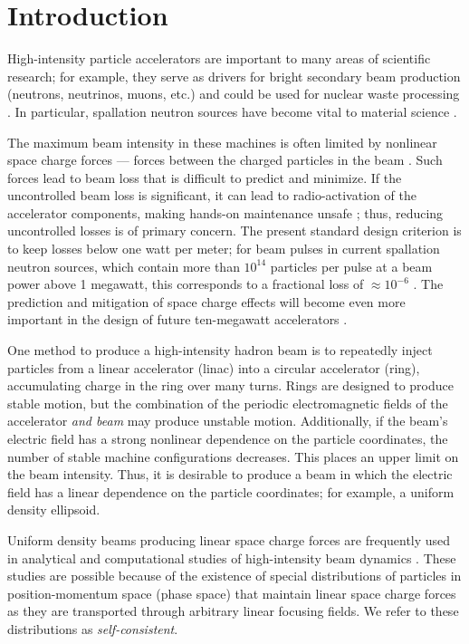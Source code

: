 \chapter{Introduction}\label{chap-1}

High-intensity particle accelerators are important to many areas of scientific research; for example, they serve as drivers for bright secondary beam production (neutrons, neutrinos, muons, etc.) \cite{Geer2009} and could be used for nuclear waste processing \cite{Yee-Rendon2021}. In particular, spallation neutron sources have become vital to material science \cite{Garoby2017}.

The maximum beam intensity in these machines is often limited by nonlinear space charge forces — forces between the charged particles in the beam \cite{Hofmann2017Book}. Such forces lead to beam loss that is difficult to predict and minimize. If the uncontrolled beam loss is significant, it can lead to radio-activation of the accelerator components, making hands-on maintenance unsafe \cite{Bungau2014}; thus, reducing uncontrolled losses is of primary concern. The present standard design criterion is to keep losses below one watt per meter; for beam pulses in current spallation neutron sources, which contain more than $10^{14}$ particles per pulse at a beam power above 1 megawatt, this corresponds to a fractional loss of $\approx 10^{-6}$ \cite{Henderson2014}. The prediction and mitigation of space charge effects will become even more important in the design of future ten-megawatt accelerators \cite{Wei2014}. 
 
One method to produce a high-intensity hadron beam is to repeatedly inject particles from a linear accelerator (linac) into a circular accelerator (ring), accumulating charge in the ring over many turns. Rings are designed to produce stable motion, but the combination of the periodic electromagnetic fields of the accelerator \textit{and beam} may produce unstable motion. Additionally, if the beam's electric field has a strong nonlinear dependence on the particle coordinates, the number of stable machine configurations decreases. This places an upper limit on the beam intensity. Thus, it is desirable to produce a beam in which the electric field has a linear dependence on the particle coordinates; for example, a uniform density ellipsoid.

Uniform density beams producing linear space charge forces are frequently used in analytical and computational studies of high-intensity beam dynamics \cite{Lund2004}. These studies are possible because of the existence of special distributions of particles in position-momentum space (phase space) that maintain linear space charge forces as they are transported through arbitrary linear focusing fields. We refer to these distributions as \textit{self-consistent}.

